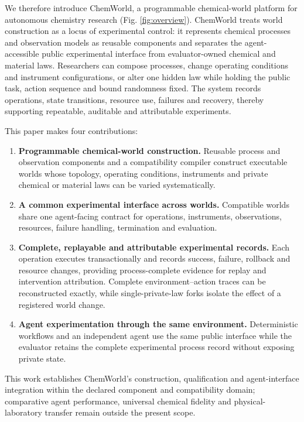 \documentclass[10pt,twocolumn]{article}
\providecommand{\tightlist}{%
  \setlength{\itemsep}{0pt}\setlength{\parskip}{0pt}}
\begin{document}
We therefore introduce ChemWorld, a programmable chemical-world platform
for autonomous chemistry research (Fig. \ref{fig:overview}). ChemWorld
treats world construction as a locus of experimental control: it
represents chemical processes and observation models as reusable
components and separates the agent-accessible public experimental
interface from evaluator-owned chemical and material laws. Researchers
can compose processes, change operating conditions and instrument
configurations, or alter one hidden law while holding the public task,
action sequence and bound randomness fixed. The system records
operations, state transitions, resource use, failures and recovery,
thereby supporting repeatable, auditable and attributable experiments.

This paper makes four contributions:

\begin{enumerate}
\def\labelenumi{\arabic{enumi}.}
\tightlist
\item
  \textbf{Programmable chemical-world construction.} Reusable process
  and observation components and a compatibility compiler construct
  executable worlds whose topology, operating conditions, instruments
  and private chemical or material laws can be varied systematically.
\item
  \textbf{A common experimental interface across worlds.} Compatible
  worlds share one agent-facing contract for operations, instruments,
  observations, resources, failure handling, termination and evaluation.
\item
  \textbf{Complete, replayable and attributable experimental records.}
  Each operation executes transactionally and records success, failure,
  rollback and resource changes, providing process-complete evidence for
  replay and intervention attribution. Complete environment--action
  traces can be reconstructed exactly, while single-private-law forks
  isolate the effect of a registered world change.
\item
  \textbf{Agent experimentation through the same environment.}
  Deterministic workflows and an independent agent use the same public
  interface while the evaluator retains the complete experimental
  process record without exposing private state.
\end{enumerate}

This work establishes ChemWorld's construction, qualification and
agent-interface integration within the declared component and
compatibility domain; comparative agent performance, universal chemical
fidelity and physical-laboratory transfer remain outside the present
scope.
\end{document}
